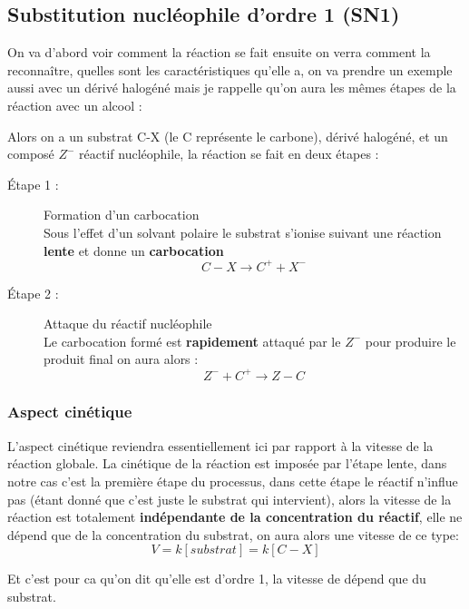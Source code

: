 \documentclass[a4paper, oneside]{book}
\begin{document}
\subsection{Substitution nucléophile d'ordre 1 (SN1)}
On va d'abord voir comment la réaction se fait ensuite on verra comment la reconnaître, quelles sont les caractéristiques qu'elle a, on va prendre un exemple aussi avec un dérivé halogéné mais je rappelle qu'on aura les mêmes étapes de la réaction avec un alcool : 

Alors on a un substrat C-X (le C représente le carbone), dérivé halogéné, et un composé $Z^-$ réactif nucléophile, la réaction se fait en deux étapes :
\begin{description}
    \item[\'Etape 1 :] Formation d'un carbocation\\
    Sous l'effet d'un solvant polaire le substrat s'ionise suivant une réaction \textbf{lente} et donne un \textbf{carbocation}
    \[
        C-X \longrightarrow C^+ + X^-
    \]
    \item[\'Etape 2 :] Attaque du réactif nucléophile\\
    Le carbocation formé est \textbf{rapidement} attaqué par le $Z^-$ pour produire le produit final on aura alors :
    \[
        Z^- + C^+ \longrightarrow Z-C
    \]
\end{description}
\subsubsection{Aspect cinétique}
L'aspect cinétique reviendra essentiellement ici par rapport à la vitesse de la réaction globale. La cinétique de la réaction est imposée par l'étape lente, dans notre cas c'est la première étape du processus, dans cette étape le réactif n'influe pas (étant donné que c'est juste le substrat qui intervient), alors la vitesse de la réaction est totalement \textbf{indépendante de la concentration du réactif}, elle ne dépend que de la concentration du substrat, on aura alors une vitesse de ce type:
\[
    V = k[substrat] = k[C-X]
\]

Et c'est pour ca qu'on dit qu'elle est d'ordre 1, la vitesse de dépend que du substrat.
\end{document}
